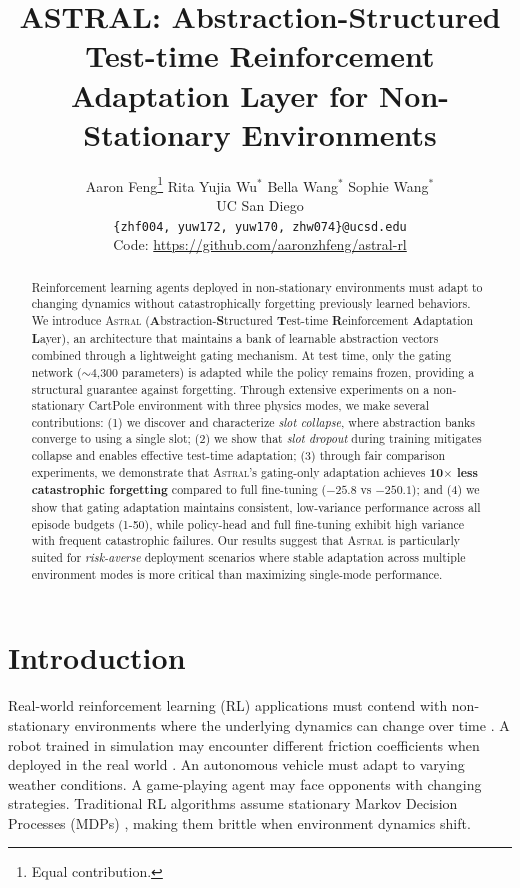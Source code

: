 \documentclass{article}
\title{ASTRAL: Abstraction-Structured Test-time Reinforcement Adaptation Layer for Non-Stationary Environments}
\author{%
  Aaron Feng\thanks{Equal contribution.} \quad Rita Yujia Wu$^*$ \quad Bella Wang$^*$ \quad Sophie Wang$^*$ \\
  UC San Diego \\
  \texttt{\{zhf004, yuw172, yuw170, zhw074\}@ucsd.edu} \\[0.5em]
  \small Code: \url{https://github.com/aaronzhfeng/astral-rl}
}
\newcommand{\astral}{\textsc{Astral}}
\newcommand{\method}{\astral}
\begin{document}
\maketitle

\begin{abstract}
Reinforcement learning agents deployed in non-stationary environments must adapt to changing dynamics without catastrophically forgetting previously learned behaviors. We introduce \method{} (\textbf{A}bstraction-\textbf{S}tructured \textbf{T}est-time \textbf{R}einforcement \textbf{A}daptation \textbf{L}ayer), an architecture that maintains a bank of learnable abstraction vectors combined through a lightweight gating mechanism. At test time, only the gating network ($\sim$4,300 parameters) is adapted while the policy remains frozen, providing a structural guarantee against forgetting. Through extensive experiments on a non-stationary CartPole environment with three physics modes, we make several contributions: (1) we discover and characterize \emph{slot collapse}, where abstraction banks converge to using a single slot; (2) we show that \emph{slot dropout} during training mitigates collapse and enables effective test-time adaptation; (3) through fair comparison experiments, we demonstrate that \method{}'s gating-only adaptation achieves \textbf{10$\times$ less catastrophic forgetting} compared to full fine-tuning ($-25.8$ vs $-250.1$); and (4) we show that gating adaptation maintains consistent, low-variance performance across all episode budgets (1-50), while policy-head and full fine-tuning exhibit high variance with frequent catastrophic failures. Our results suggest that \method{} is particularly suited for \emph{risk-averse} deployment scenarios where stable adaptation across multiple environment modes is more critical than maximizing single-mode performance.
\end{abstract}

\section{Introduction}
\label{sec:intro}

Real-world reinforcement learning (RL) applications must contend with non-stationary environments where the underlying dynamics can change over time \citep{padakandla2020survey, xie2020deep}. A robot trained in simulation may encounter different friction coefficients when deployed in the real world \citep{tobin2017domain, kumar2021rma}. An autonomous vehicle must adapt to varying weather conditions. A game-playing agent may face opponents with changing strategies. Traditional RL algorithms assume stationary Markov Decision Processes (MDPs) \citep{hallak2015contextual}, making them brittle when environment dynamics shift.
\end{document}

